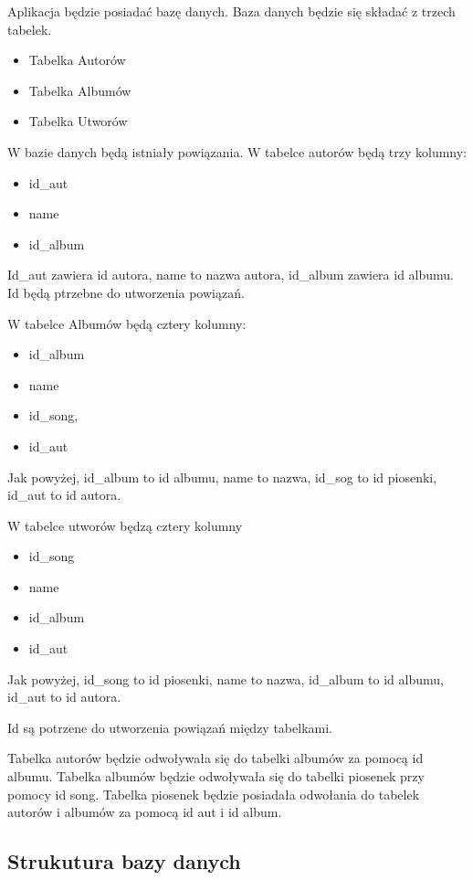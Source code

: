 
Aplikacja będzie posiadać bazę danych. Baza danych będzie się składać z trzech tabelek.

\begin{itemize}
	\item Tabelka Autorów
	\item Tabelka Albumów
	\item Tabelka Utworów
\end{itemize}

W bazie danych będą istniały powiązania. W tabelce autorów będą trzy kolumny:
\begin{itemize}
	\item id\_aut
	\item name
	\item id\_album
\end{itemize}
Id\_aut zawiera id autora, name to nazwa autora, id\_album zawiera id albumu. Id będą ptrzebne do utworzenia powiązań.

W tabelce Albumów będą cztery kolumny:
\begin{itemize}
	\item id\_album
	\item name
	\item id\_song,
	\item id\_aut
\end{itemize}
Jak powyżej, id\_album to id albumu, name to nazwa, id\_sog to id piosenki, id\_aut to id autora.

W tabelce utworów będzą cztery kolumny
\begin{itemize}
	\item id\_song
	\item name
	\item id\_album
	\item id\_aut
\end{itemize}

Jak powyżej, id\_song to id piosenki, name to nazwa, id\_album to id albumu, id\_aut to id autora.

Id są potrzene do utworzenia powiązań między tabelkami.

Tabelka autorów będzie odwoływała się do tabelki albumów za pomocą id albumu. Tabelka albumów będzie odwoływała się do tabelki piosenek przy pomocy id song. Tabelka piosenek będzie posiadała odwołania do tabelek autorów i albumów za pomocą id aut i id album.

\subsection{Strukutura bazy danych}

